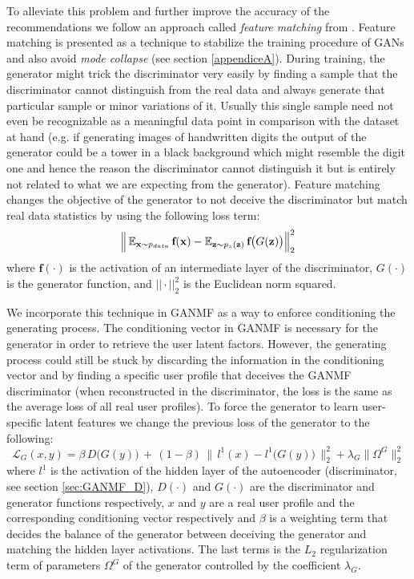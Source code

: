 To alleviate this problem and further improve the accuracy of the recommendations we follow an approach called \emph{feature matching} from \cite{salimans2016improved}. Feature matching is presented as a technique to stabilize the training procedure of GANs and also avoid \emph{mode collapse} (see section \ref{appendiceA}). During training, the generator might trick the discriminator very easily by finding a sample that the discriminator cannot distinguish from the real data and always generate that particular sample or minor variations of it. Usually this single sample need not even be recognizable as a meaningful data point in comparison with the dataset at hand (e.g. if generating images of handwritten digits the output of the generator could be a tower in a black background which might resemble the digit one and hence the reason the discriminator cannot distinguish it but is entirely not related to what we are expecting from the generator). Feature matching changes the objective of the generator to not deceive the discriminator but match real data statistics by using the following loss term:
\[
\Big\|\operatorname{\mathbb{E}}_{\textbf{x} \sim{p_{data}}} \textbf{f}(\textbf{x}) - \operatorname{\mathbb{E}}_{\textbf{z} \sim{p_{z}(\textbf{z})}} \textbf{f}\big(G(\textbf{z})\big)\Big\|^2_{2}
\]
where $\textbf{f}(\cdot)$ is the activation of an intermediate layer of the discriminator, $G(\cdot)$ is the generator function, and $||\cdot||^2_{2}$ is the Euclidean norm squared.

We incorporate this technique in GANMF as a way to enforce conditioning the generating process. The conditioning vector in GANMF is necessary for the generator in order to retrieve the user latent factors. However, the generating process could still be stuck by discarding the information in the conditioning vector and by finding a specific user profile that deceives the GANMF discriminator (when reconstructed in the discriminator, the loss is the same as the average loss of all real user profiles). To force the generator to learn user-specific latent features we change the previous loss of the generator to the following:
\begin{equation}
    \mathcal{L}_{G}(x, y) = \beta \, D\big(G(y)\big) \,+\, (1-\beta) \,\Big\| \, l^1(x) - l^1\big(G(y)\big) \,\Big\|^2_{2} + \lambda_{G} \|\Omega^{G}\|^{2}_{2}
    \label{eq:generator_loss_feature}
\end{equation}
where $l^1$ is the activation of the hidden layer of the autoencoder (discriminator, see section \ref{sec:GANMF_D}), $D(\cdot)$ and $G(\cdot)$ are the discriminator and generator functions respectively, $x$ and $y$ are a real user profile and the corresponding conditioning vector respectively and $\beta$ is a weighting term that decides the balance of the generator between deceiving the generator and matching the hidden layer activations. The last terms is the $L_{2}$ regularization term of parameters $\Omega^{G}$ of the generator controlled by the coefficient $\lambda_{G}$.

